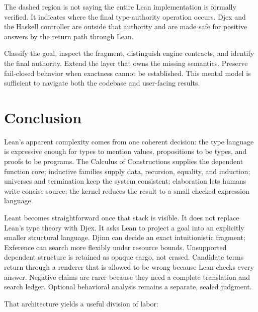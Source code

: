 \documentclass[10pt,letterpaper,oneside,openany]{report}
\begin{document}
The dashed region is not saying the entire Lean implementation is formally verified.  It indicates where the final type-authority operation occurs.  Djex and the Haskell controller are outside that authority and are made safe for positive answers by the return path through Lean.

\begin{recapbox}
Classify the goal, inspect the fragment, distinguish engine contracts, and identify the final authority.  Extend the layer that owns the missing semantics.  Preserve fail-closed behavior when exactness cannot be established.  This mental model is sufficient to navigate both the codebase and user-facing results.
\end{recapbox}


\chapter*{Conclusion}

Lean's apparent complexity comes from one coherent decision: the type language is expressive enough for types to mention values, propositions to be types, and proofs to be programs.  The Calculus of Constructions supplies the dependent function core; inductive families supply data, recursion, equality, and induction; universes and termination keep the system consistent; elaboration lets humans write concise source; the kernel reduces the result to a small checked expression language.

Leant becomes straightforward once that stack is visible.  It does not replace Lean's type theory with Djex.  It asks Lean to project a goal into an explicitly smaller structural language.  Djinn can decide an exact intuitionistic fragment; Exference can search more flexibly under resource bounds.  Unsupported dependent structure is retained as opaque cargo, not erased.  Candidate terms return through a renderer that is allowed to be wrong because Lean checks every answer.  Negative claims are rarer because they need a complete translation and search ledger.  Optional behavioral analysis remains a separate, sealed judgment.

That architecture yields a useful division of labor:
\end{document}

